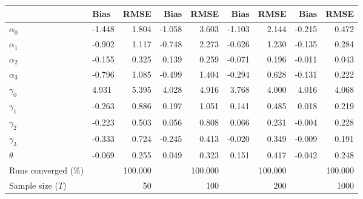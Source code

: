 
\begin{tabular}[t]{llrrrrrrr}
\toprule
  & Bias & RMSE & Bias & RMSE & Bias & RMSE & Bias & RMSE\\
\midrule
$\alpha_{0}$ & -1.448 & 1.804 & -1.058 & 3.603 & -1.103 & 2.144 & -0.215 & 0.472\\
$\alpha_{1}$ & -0.902 & 1.117 & -0.748 & 2.273 & -0.626 & 1.230 & -0.135 & 0.284\\
$\alpha_{2}$ & -0.155 & 0.325 & 0.139 & 0.259 & -0.071 & 0.196 & -0.011 & 0.043\\
$\alpha_{3}$ & -0.796 & 1.085 & -0.499 & 1.404 & -0.294 & 0.628 & -0.131 & 0.222\\
$\gamma_{0}$ & 4.931 & 5.395 & 4.028 & 4.916 & 3.768 & 4.000 & 4.016 & 4.068\\
$\gamma_{1}$ & -0.263 & 0.886 & 0.197 & 1.051 & 0.141 & 0.485 & 0.018 & 0.219\\
$\gamma_{2}$ & -0.223 & 0.503 & 0.056 & 0.808 & 0.066 & 0.231 & -0.004 & 0.228\\
$\gamma_{3}$ & -0.333 & 0.724 & -0.245 & 0.413 & -0.020 & 0.349 & -0.009 & 0.191\\
$\theta$ & -0.069 & 0.255 & 0.049 & 0.323 & 0.151 & 0.417 & -0.042 & 0.248\\
Runs converged (\%) &  & 100.000 &  & 100.000 &  & 100.000 &  & 100.000\\
Sample size ($T$) &  & 50 &  & 100 &  & 200 &  & 1000\\
\bottomrule
\end{tabular}
